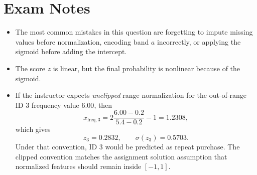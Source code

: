 \documentclass[11pt]{article}
\begin{document}
\section*{Exam Notes}

\begin{itemize}
    \item The most common mistakes in this question are forgetting to impute
    missing values before normalization, encoding band \(a\) incorrectly, or
    applying the sigmoid before adding the intercept.
    \item The score \(z\) is linear, but the final probability is nonlinear because
    of the sigmoid.
    \item If the instructor expects \emph{unclipped} range normalization for the
    out-of-range ID 3 frequency value \(6.00\), then
    \[
        x_{\text{freq},3}
        =
        2\frac{6.00-0.2}{5.4-0.2}-1
        =
        1.2308,
    \]
    which gives
    \[
        z_3=0.2832,\qquad \sigma(z_3)=0.5703.
    \]
    Under that convention, ID 3 would be predicted as repeat purchase. The
    clipped convention matches the assignment solution assumption that normalized
    features should remain inside \([-1,1]\).
\end{itemize}
\end{document}
